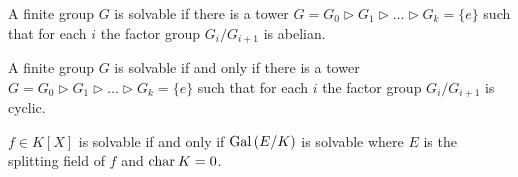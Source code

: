 \documentclass[12pt]{extarticle}
\begin{document}
\begin{definition}
A finite group $G$ is solvable if there is a tower $G = G_0 \triangleright G_1 \triangleright \dots \triangleright G_k = \{e\}$ such that for each $i$ the factor group $G_{i}/G_{i+1}$ is abelian. 
\end{definition}

\begin{lemma}
A finite group $G$ is solvable if and only if there is a tower $G = G_0 \triangleright G_1 \triangleright \dots \triangleright G_k = \{e\}$ such that for each $i$ the factor group $G_{i}/G_{i+1}$ is cyclic. 
\end{lemma}

\begin{theorem}[Galois]
$f \in K[X]$ is solvable if and only if $\mathrm{Gal}\left( E/K \right)$ is solvable where $E$ is the splitting field of $f$ and $\mathrm{char} \: K = 0$.
\end{theorem}
\end{document}
